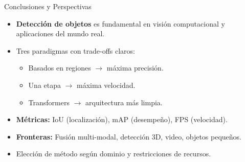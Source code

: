 \documentclass[aspectratio=169, 10pt]{beamer}
\begin{document}
\begin{frame}{Conclusiones y Perspectivas}

	\begin{itemize}
		\item \textbf{Detecci\'on de objetos} es fundamental en visi\'on computacional y aplicaciones del mundo real.

		\vspace{0.3cm}

		\item Tres paradigmas con trade-offs claros:
		\begin{itemize}
			\item Basados en regiones $\to$ m\'axima precisi\'on.
			\item Una etapa $\to$ m\'axima velocidad.
			\item Transformers $\to$ arquitectura m\'as limpia.
		\end{itemize}

		\vspace{0.3cm}

		\item \textbf{M\'etricas:} IoU (localizaci\'on), mAP (desempe\~no), FPS (velocidad).

		\vspace{0.3cm}

		\item \textbf{Fronteras:} Fusi\'on multi-modal, detecci\'on 3D, video, objetos peque\~nos.

		\vspace{0.3cm}

		\item Elecci\'on de m\'etodo seg\'un dominio y restricciones de recursos.
	\end{itemize}

\end{frame}
\end{document}
